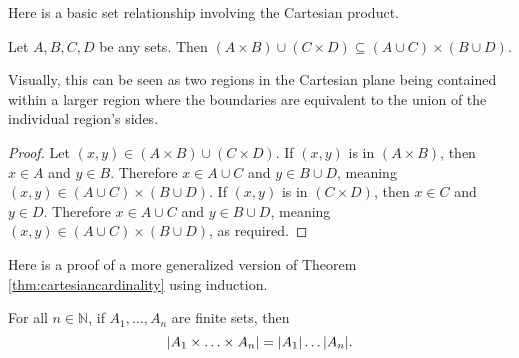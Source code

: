\documentclass[../notes.tex]{subfiles}
\begin{document}
Here is a basic set relationship involving the Cartesian product.
\begin{multicols}{2}
	\begin{theorem}
		Let $A,B,C,D$ be any sets. Then $(A\times B)\cup (C\times D) \subseteq (A\cup C)\times (B\cup D)$. 
	\end{theorem}
	Visually, this can be seen as two regions in the Cartesian plane being contained within a larger region where the boundaries are equivalent to the union of the individual region's sides.

	\columnbreak

	\centering
\end{multicols}

\begin{proof}
	Let $(x,y) \in (A \times B) \cup (C \times D)$. If $(x,y)$ is in $(A \times B)$, then $x \in A$ and $y \in B$. Therefore $x \in A \cup C$ and $y \in B \cup D$, meaning $(x,y) \in (A \cup C) \times (B \cup D)$. If $(x,y)$ is in $(C \times D)$, then $x \in C$ and $y \in D$. Therefore $x \in A \cup C$ and $y \in B \cup D$, meaning $(x,y) \in (A \cup C) \times (B \cup D)$, as required.
\end{proof}

Here is a proof of a more generalized version of Theorem \ref{thm:cartesiancardinality} using induction.

\begin{theorem}
	For all $n\in\mathbb{N}$, if $A_1, \ldots , A_n$ are finite sets, then 
	\[
		\qty|A_1 \times \ldots \times A_n| = \qty|A_1| \ldots \qty|A_n|
	.\]
\end{theorem}
\end{document}
